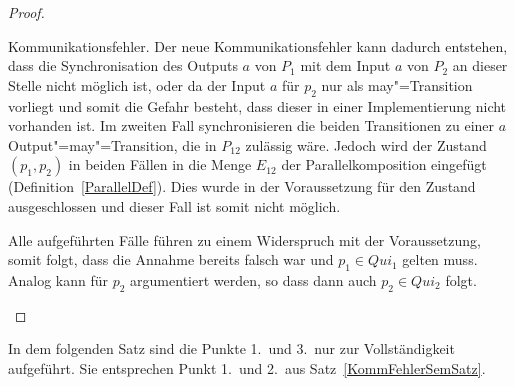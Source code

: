 \begin{proof}
\begin{enumerate}
\begin{itemize}
          Kommunikationsfehler. Der neue Kommunikationsfehler kann dadurch
          entstehen, dass die Synchronisation des Outputs $a$ von $P_1$ mit dem
          Input $a$ von $P_2$ an dieser Stelle nicht möglich ist, oder da der
          Input $a$ für $p_2$ nur als may"=Transition vorliegt und somit die
          Gefahr besteht, dass dieser in einer Implementierung nicht vorhanden
          ist. Im zweiten Fall synchronisieren die beiden Transitionen zu einer
          $a$ Output"=may"=Transition, die in $P_{12}$ zulässig wäre. Jedoch
          wird der Zustand $(p_1,p_2)$ in beiden Fällen in die Menge $E_{12}$
          der Parallelkomposition eingefügt (Definition~\ref{ParallelDef}).
          Dies wurde in der Voraussetzung für den Zustand ausgeschlossen und
          dieser Fall ist somit nicht möglich.
      \end{itemize}
      Alle aufgeführten Fälle führen zu einem Widerspruch mit der
      Voraussetzung, somit folgt, dass die Annahme bereits falsch war und
      $p_1\in Qui_1$ gelten muss. Analog kann für $p_2$ argumentiert werden, so
      dass dann auch $p_2\in Qui_2$ folgt.
  \end{enumerate}
\end{proof}

In dem folgenden Satz sind die Punkte 1.\ und 3.\ nur zur Vollständigkeit
aufgeführt. Sie entsprechen Punkt 1.\ und 2.\ aus Satz~\ref{KommFehlerSemSatz}.

